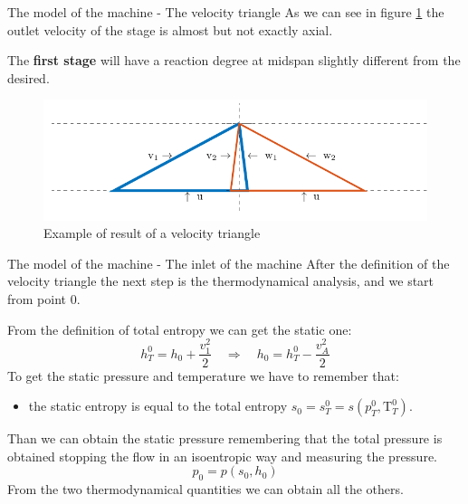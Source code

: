 \documentclass{beamer}
\newcommand{\myspace}[0]{\vspace{0.3cm}}
\newcommand{\myspaceneg}[0]{\vspace{-0.15cm}}
\newcommand{\highlightgreenC}[1]{\textcolor{chameleongreen3}{#1}}%
\begin{document}
\begin{frame}[t]{The model of the machine - The velocity triangle}
As we can see in figure \ref{fig:velocitytriangle_example} the outlet velocity of the stage is almost but not exactly axial.

The \textbf{first stage} will have a reaction degree at midspan slightly different from the desired. 

\begin{figure}[hbtp]
\centering
\includegraphics[scale=0.7]{fig/velocity_triangle_example.pdf}
\caption{Example of result of a velocity triangle}
\label{fig:velocitytriangle_example}
\end{figure}
\end{frame}


\begin{frame}[t]{The model of the machine - The inlet of the machine}
After the definition of the velocity triangle the next step is the thermodynamical analysis, and we start from point 0.

From the definition of total entropy we can get the static one:
\myspaceneg
\begin{equation}
h_T^0 = h_0 + \frac{v_1^2}{2} \quad \Rightarrow \quad h_0 = h_T^0 - \frac{v_A^2}{2}
\end{equation}
\myspaceneg
To get the static pressure and temperature we have to remember that:
\begin{itemize}
	\item \highlightgreenC{the static entropy is equal to the total entropy $s_0 = s_T^0 = s(p_T^{0}, \text{T}_T^{0})$}.
\end{itemize}
\myspace\myspaceneg
Than we can obtain the static pressure remembering that the total pressure is obtained stopping the flow in an isoentropic way and measuring the pressure.
\myspaceneg\myspaceneg\myspaceneg
\begin{equation}
p_0 = p(s_0, h_0)
\end{equation}
\myspaceneg
\myspaceneg
From the two thermodynamical quantities we can obtain all the others.
\end{frame}
\end{document}
